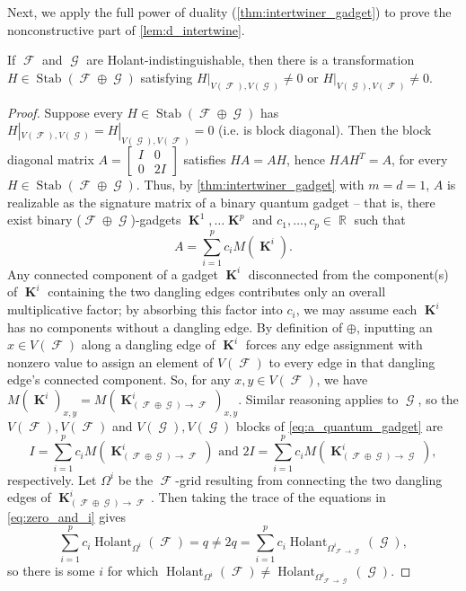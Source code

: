 \documentclass{article}
\DeclareMathOperator{\rr}{\mathbb{R}}
\DeclareMathOperator{\vk}{\mathbf{K}}
\DeclareMathOperator{\fc}{\mathcal{F}}
\DeclareMathOperator{\gc}{\mathcal{G}}
\DeclareMathOperator{\stab}{Stab}
\DeclareMathOperator{\holant}{Holant}
\begin{document}
Next, we apply the full power of duality (\autoref{thm:intertwiner_gadget}) to prove the
nonconstructive part of \autoref{lem:d_intertwine}.
\begin{lemma} \label{lem:offdiagblock}
    If $\fc$ and $\gc$ are Holant-indistinguishable, then there is a transformation
    $H \in \stab(\fc \oplus \gc)$ satisfying $H|_{V(\fc),V(\gc)} \neq 0$ or 
    $H|_{V(\gc),V(\fc)} \neq 0$.
\end{lemma}
\begin{proof}
    Suppose every $H \in \stab(\fc \oplus \gc)$ has $H|_{V(\fc),V(\gc)} = H|_{V(\gc),V(\fc)} = 0$
    (i.e. is block diagonal). Then the block diagonal
    matrix $A = \begin{bmatrix} I & 0 \\ 0 & 2I \end{bmatrix}$
    satisfies $H A = A H$, hence $HAH^T = A$, for every $H \in \stab(\fc \oplus \gc)$. Thus,
    by \autoref{thm:intertwiner_gadget} with $m=d=1$, $A$ is realizable as the signature matrix 
    of a binary quantum gadget
    -- that is, there exist binary ($\fc \oplus \gc$)-gadgets $\vk^1, \ldots \vk^p$ and
    $c_1,\ldots,c_p \in \rr$ such that
    \begin{equation}
        \label{eq:a_quantum_gadget}
        A = \sum_{i=1}^p c_i M(\vk^i).
    \end{equation}
    Any connected component of a gadget $\vk^i$ disconnected from the component(s) of $\vk^i$ containing the
    two dangling edges contributes only an overall multiplicative factor; by absorbing this factor
    into $c_i$, we may assume each $\vk^i$ has no components without a dangling edge. By definition
    of $\oplus$, inputting an
    $x \in V(\fc)$ along a dangling edge of $\vk^i$ forces any edge assignment with nonzero value to 
    assign
    an element of $V(\fc)$ to every edge in that dangling edge's connected component. So, for any $x,y \in V(\fc)$,
    we have $M(\vk^i)_{x,y} = M(\vk^i_{(\fc \oplus \gc) \to \fc})_{x,y}$. 
    Similar reasoning applies to
    $\gc$, so the $V(\fc),V(\fc)$ and $V(\gc),V(\gc)$ blocks of \eqref{eq:a_quantum_gadget} are
    \begin{equation}
        I = \sum_{i=1}^p c_i M(\vk^i_{(\fc \oplus \gc) \to \fc})
        \text{ and }
        2I = \sum_{i=1}^p c_i M(\vk^i_{(\fc \oplus \gc) \to \gc}),
        \label{eq:zero_and_i}
    \end{equation}
    respectively.
    Let $\Omega^i$ be the $\fc$-grid resulting from connecting the two dangling edges of 
    $\vk^i_{(\fc \oplus \gc) \to \fc}$. Then
    taking the trace of the equations in \eqref{eq:zero_and_i} gives
    \[
        \sum_{i=1}^p c_i \holant_{\Omega^i}(\fc) = q \neq 2q = 
        \sum_{i=1}^p c_i \holant_{\Omega^i_{\fc\to\gc}}(\gc),
    \]
    so there is some $i$ for which $\holant_{\Omega^i}(\fc) \neq \holant_{\Omega^i_{\fc\to\gc}}(\gc)$.
\end{proof}
\end{document}
